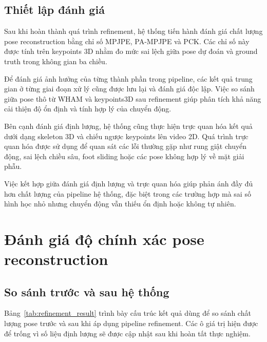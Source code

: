 \documentclass[../DoAn.tex]{subfiles}
\begin{document}
\subsection{Thiết lập đánh giá}

Sau khi hoàn thành quá trình refinement, hệ thống tiến hành đánh giá chất lượng pose reconstruction bằng chỉ số MPJPE, PA-MPJPE và PCK. Các chỉ số này được tính trên keypoints 3D nhằm đo mức sai lệch giữa pose dự đoán và ground truth trong không gian ba chiều.

Để đánh giá ảnh hưởng của từng thành phần trong pipeline, các kết quả trung gian ở từng giai đoạn xử lý cũng được lưu lại và đánh giá độc lập. Việc so sánh giữa pose thô từ WHAM và keypoints3D sau refinement giúp phân tích khả năng cải thiện độ ổn định và tính hợp lý của chuyển động.

Bên cạnh đánh giá định lượng, hệ thống cũng thực hiện trực quan hóa kết quả dưới dạng skeleton 3D và chiếu ngược keypoints lên video 2D. Quá trình trực quan hóa được sử dụng để quan sát các lỗi thường gặp như rung giật chuyển động, sai lệch chiều sâu, foot sliding hoặc các pose không hợp lý về mặt giải phẫu.

Việc kết hợp giữa đánh giá định lượng và trực quan hóa giúp phản ánh đầy đủ hơn chất lượng của pipeline hệ thống, đặc biệt trong các trường hợp mà sai số hình học nhỏ nhưng chuyển động vẫn thiếu ổn định hoặc không tự nhiên.

\section{Đánh giá độ chính xác pose reconstruction}

\subsection{So sánh trước và sau hệ thống}

Bảng~\ref{tab:refinement_result} trình bày cấu trúc kết quả dùng để so sánh chất lượng pose trước và sau khi áp dụng pipeline refinement. Các ô giá trị hiện được để trống vì số liệu định lượng sẽ được cập nhật sau khi hoàn tất thực nghiệm.
\end{document}

